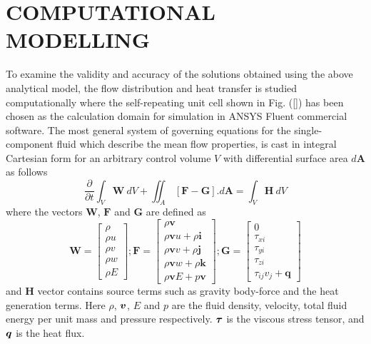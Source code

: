 \documentclass[twocolumn,10pt,cleanfoot]{ihmtc}
\begin{document}
\section{COMPUTATIONAL MODELLING}\label{compmodel}
To examine the validity and accuracy of the solutions obtained using the above analytical model, the flow distribution and heat transfer is studied computationally where the self-repeating unit cell shown in Fig. (\ref{}) has been chosen as the calculation domain for simulation in ANSYS Fluent commercial software. The most general system of governing equations for the single-component fluid which describe the mean flow properties, is cast in integral Cartesian form for an arbitrary control volume $V$ with differential surface area $d\boldsymbol{A}$ as follows
%
\begin{equation*}
\frac{\partial}{\partial t}\int_{V}\boldsymbol{W\:}dV+\iint_{A}\,[\mathbf{F}-\mathbf{G}].d\boldsymbol{A}=\int_{V}\boldsymbol{H\:}dV 
\end{equation*}
%
where the vectors $\boldsymbol{W}$, $\mathbf{F}$ and $\mathbf{G}$ are defined as 
%
\begin{equation*}
 \boldsymbol{W}=\left[\begin{array}{c} \rho\\ \rho u\\ \rho v\\ \rho w\\ \rho E \end{array}\right] ; \boldsymbol{\mathbf{F}}=\left[\begin{array}{c} \rho\boldsymbol{v}\\ \rho\boldsymbol{v}u+\rho\boldsymbol{i}\\ \rho\boldsymbol{v}v+\rho\boldsymbol{j}\\ \rho\boldsymbol{v}w+\rho\boldsymbol{k}\\ \rho\boldsymbol{v}E+p\boldsymbol{v} \end{array}\right] ; \mathbf{G}=\left[\begin{array}{c} 0\\ \tau_{xi}\\ \tau_{yi}\\ \tau_{zi}\\ \tau_{ij}v_{j}+\boldsymbol{q} \end{array}\right]
\end{equation*}
%
and $\boldsymbol{H}$ vector contains source terms such as gravity body-force and the heat generation terms. Here $\rho$, ${\mbox{\boldmath$v$}}$, $E$ and $p$ are the fluid density, velocity, total fluid energy per unit mass and pressure respectively. ${\mbox{\boldmath$\tau$}}$ is the viscous stress tensor, and ${\mbox{\boldmath$q$}}$ is the heat flux. \\
\end{document}
